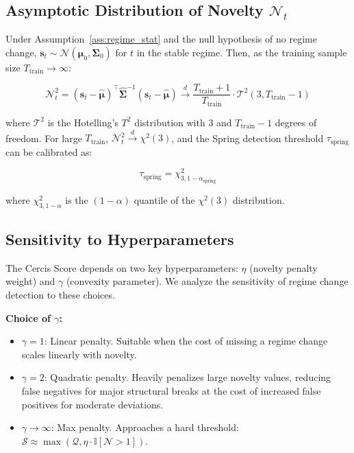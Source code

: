 \documentclass[12pt,a4paper]{article}
\begin{document}
\subsection{Asymptotic Distribution of Novelty $\mathcal{N}_t$}

Under Assumption~\ref{ass:regime_stat} and the null hypothesis of
no regime change, $\mathbf{s}_t \sim \mathcal{N}(\boldsymbol{\mu}_0,
\mathbf{\Sigma}_0)$ for $t$ in the stable regime.  Then, as the
training sample size $T_{\text{train}} \to \infty$:

\begin{equation}
    \mathcal{N}_t^2 = (\mathbf{s}_t - \hat{\boldsymbol{\mu}})^\top
    \hat{\mathbf{\Sigma}}^{-1} (\mathbf{s}_t - \hat{\boldsymbol{\mu}})
    \xrightarrow{d} \frac{T_{\text{train}} + 1}{T_{\text{train}}}
    \cdot \mathcal{T}^2(3, T_{\text{train}} - 1)
    \label{eq:novelty_asymp}
\end{equation}

where $\mathcal{T}^2$ is the Hotelling's $T^2$ distribution with
3 and $T_{\text{train}} - 1$ degrees of freedom.  For large
$T_{\text{train}}$, $\mathcal{N}_t^2 \xrightarrow{d} \chi^2(3)$,
and the Spring detection threshold $\tau_{\text{spring}}$ can be
calibrated as:

\begin{equation}
    \tau_{\text{spring}} = \chi^2_{3, 1-\alpha_{\text{spring}}}
    \label{eq:spring_threshold}
\end{equation}

where $\chi^2_{3, 1-\alpha}$ is the $(1-\alpha)$ quantile of the
$\chi^2(3)$ distribution.

\subsection{Sensitivity to Hyperparameters}

The Cercis Score depends on two key hyperparameters: $\eta$ (novelty
penalty weight) and $\gamma$ (convexity parameter).  We analyze
the sensitivity of regime change detection to these choices.

\textbf{Choice of $\gamma$:}
\begin{itemize}[leftmargin=*]
    \item $\gamma = 1$: Linear penalty.  Suitable when the cost of
    missing a regime change scales linearly with novelty.
    \item $\gamma = 2$: Quadratic penalty.  Heavily penalizes large
    novelty values, reducing false negatives for major structural
    breaks at the cost of increased false positives for moderate
    deviations.
    \item $\gamma \to \infty$: Max penalty.  Approaches a hard
    threshold: $\mathcal{S} \approx \max(\mathcal{Q}, \eta \cdot
    \mathbb{I}[\mathcal{N} > 1])$.
\end{itemize}
\end{document}
